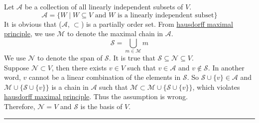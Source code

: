 \documentclass[12pt]{article}
\numberwithin{equation}{section}
\theoremstyle{plain} %
\theoremstyle{definition}
\theoremstyle{remark}
\newenvironment{proof}{{\bf Proof:}}{\hfill\rule{2mm}{2mm}}
\begin{document}
\begin{proof}
Let $\mathcal{A}$ be a collection of all linearly independent subsets of $V$.
$$\mathcal{A} = \{W \mid W \subseteq V\text{ and }W\text{ is a linearly independent subset}\}$$ 
It is obvious that ($\mathcal{A}$, $\subset$) is a partially order set. From \hyperref[statement:Hausdorff maximal principle]{hausdorff maximal principle}, we use $\mathcal{M}$ to denote the maximal chain in $\mathcal{A}$. 
$$\mathcal{S} = \bigcup_{m \in \mathcal{M}}m$$
We use $\mathcal{N}$ to denote the span of $\mathcal{S}$. It is true that $\mathcal{S} \subseteq \mathcal{N} \subseteq V$.  \\
Suppose $\mathcal{N} \subset V$, then there exists $v \in V$ such that $v \in \mathcal{A}$ and $v \notin \mathcal{S}$. In another word, $v$ cannot be a linear combination of the elements in $\mathcal{S}$. 
So $\mathcal{S} \cup \{v\} \in \mathcal{A}$ and $\mathcal{M} \cup \{ \mathcal{S} \cup \{v\}\}$ is a chain in $\mathcal{A}$ such that $\mathcal{M} \subset \mathcal{M} \cup \{ \mathcal{S} \cup \{v\}\}$, which violates \hyperref[statement:Hausdorff maximal principle]{hausdorff maximal principle}. Thus the assumption is wrong. \\
Therefore, $\mathcal{N} = V$ and $\mathcal{S}$ is the basis of $V$. 
\end{proof}


%  	
%
%


\end{document}
